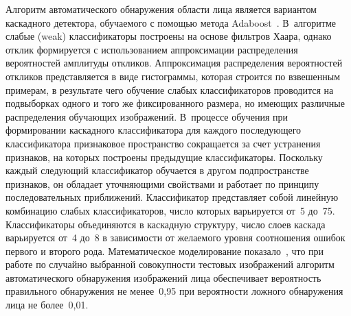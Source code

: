 \begin{multicols}{2}
Алгоритм автоматического обнаружения об\-ласти лица является вариантом каскадного детектора, обучаемого с помощью метода 
Adaboost~\cite{1kor, 2kor}. В~алгоритме слабые (weak) классификаторы построены на основе фильтров Хаара, однако отклик 
формируется с использованием аппроксимации распределения вероятностей амплитуды откликов.\linebreak
 Аппроксимация распределения 
вероятностей откликов представляется в виде гистограммы, которая строится по взвешенным примерам, в результате чего 
обучение слабых классификаторов\linebreak
 проводится на подвыборках одного и того же фиксированного размера, но имеющих 
различные распределения обучающих изображений. В~процессе обучения при формировании каскадного классификатора для 
каж\-до\-го последующего классификатора признаковое пространство сокращается за счет устранения признаков, на которых 
построены предыдущие классификаторы. Поскольку каждый\linebreak
 следующий классификатор обучается в другом\linebreak
  подпространстве 
признаков, он обладает уточ\-ня\-ющи\-ми свойствами и работает по принципу последовательных приближений. Классификатор 
представляет собой линейную комбинацию слабых классификаторов, число которых варьируется от~5 до~75. Классификаторы 
объединяются в каскадную структуру, число слоев каскада варьируется от~4 до~8 в зависимости от желаемого уровня 
соотношения ошибок первого и второго рода. Математическое моделирование показало~\cite{3kor}, что при работе по случайно 
выбранной совокупности тестовых изоб\-ра\-же\-ний алгоритм автоматического обнаружения изображений лица обеспечивает 
вероятность правильного обнаружения не менее~0,95 при веро\-ят\-ности ложного обнаружения лица не более~0,01. 


\end{multicols}
